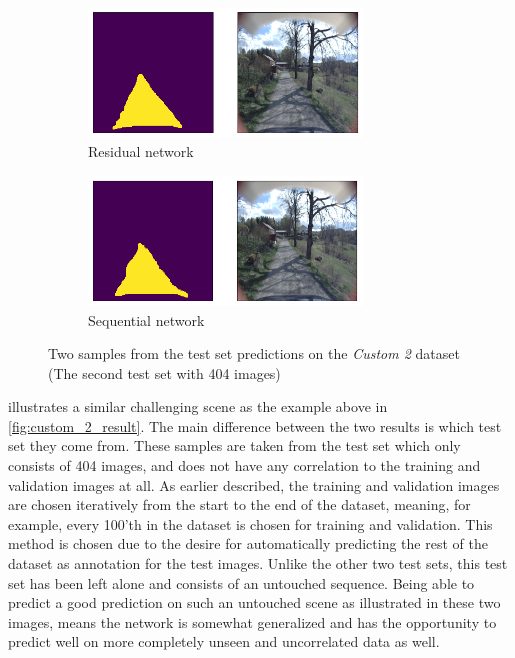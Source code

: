 \documentclass[USenglish]{ifimaster}  %
\begin{document}
\begin{figure}[ht]
\centering
\begin{subfigure}[b]{\textwidth}
\centering
\includegraphics[width=0.8\textwidth]{bilder/custom_2_exclusive/1938_res.png}
\caption{Residual network}
\label{fig:custom_2_2_res}
\end{subfigure}
\hfill
\begin{subfigure}[b]{\textwidth}
\centering
\includegraphics[width=0.8\textwidth]{bilder/custom_2_exclusive/1938_seq.png}
\caption{Sequential network}
\label{fig:custom_2_2_seq}
\end{subfigure}
\caption{Two samples from the test set predictions on the \textit{Custom 2} dataset (The second test set with 404 images)}
\label{fig:custom_2_result_404}
\end{figure}

 illustrates a similar challenging scene as the example above in \cref{fig:custom_2_result}. The main difference between the two results is which test set they come from. These samples are taken from the test set which only consists of 404 images, and does not have any correlation to the training and validation images at all. As earlier described, the training and validation images are chosen iteratively from the start to the end of the dataset, meaning, for example, every 100'th in the dataset is chosen for training and validation. This method is chosen due to the desire for automatically predicting the rest of the dataset as annotation for the test images. Unlike the other two test sets, this test set has been left alone and consists of an untouched sequence. Being able to predict a good prediction on such an untouched scene as illustrated in these two images, means the network is somewhat generalized and has the opportunity to predict well on more completely unseen and uncorrelated data as well.
\end{document}
